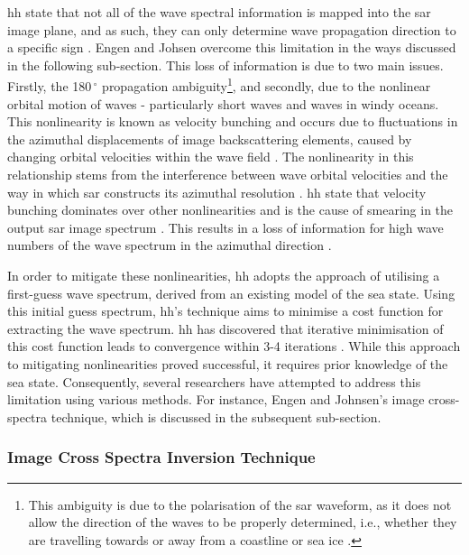 \ac{hh} state that not all of the wave spectral information is mapped into the \acs{sar} image plane, and as such, they can only determine wave propagation direction to a specific sign \cite{Hasselmann1991}. Engen and Johsen \cite{Engen1995} overcome this limitation in the ways discussed in the following sub-section. This loss of information is due to two main issues. Firstly, the 180\,$^{\circ}$ propagation ambiguity\footnote{This ambiguity is due to the polarisation of the \acs{sar} waveform, as it does not allow the direction of the waves to be properly determined, i.e., whether they are travelling towards or away from a coastline or sea ice \cite{Fernandes2000}.}, and secondly, due to the nonlinear orbital motion of waves - particularly short waves and waves in windy oceans. This nonlinearity is known as velocity bunching and occurs due to fluctuations in the azimuthal displacements of image backscattering elements, caused by changing orbital velocities within the wave field \cite{Hasselmann1991}. The nonlinearity in this relationship stems from the interference between wave orbital velocities and the way in which \acs{sar} constructs its azimuthal resolution \cite{Mastenbroek2000}. \ac{hh} state that velocity bunching dominates over other nonlinearities and is the cause of smearing in the output \acs{sar} image spectrum \cite{Hasselmann1991}. This results in a loss of information for high wave numbers of the wave spectrum in the azimuthal direction \cite{Hasselmann1991, Hasselmann1996}.

In order to mitigate these nonlinearities, \ac{hh} adopts the approach of utilising a first-guess wave spectrum, derived from an existing model of the sea state. Using this initial guess spectrum, \ac{hh}'s technique aims to minimise a cost function for extracting the wave spectrum. \ac{hh} has discovered that iterative minimisation of this cost function leads to convergence within 3-4 iterations \cite{Hasselmann1991}. While this approach to mitigating nonlinearities proved successful, it requires prior knowledge of the sea state. Consequently, several researchers have attempted to address this limitation using various methods. For instance, Engen and Johnsen's \cite{Engen1995} image cross-spectra technique, which is discussed in the subsequent sub-section.

\subsubsection{Image Cross Spectra Inversion Technique} \label{subsubsec:litReview.sarCharac.oceanWaveInversion.Engen}


